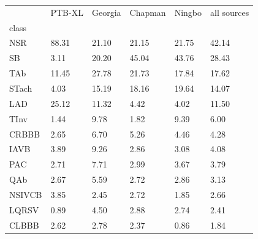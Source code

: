\begin{tabular}{llllll}
\toprule
 & PTB-XL & Georgia & Chapman & Ningbo & all sources \\
class &  &  &  &  &  \\
\midrule
NSR & 88.31 & 21.10 & 21.15 & 21.75 & 42.14 \\
SB & 3.11 & 20.20 & 45.04 & 43.76 & 28.43 \\
TAb & 11.45 & 27.78 & 21.73 & 17.84 & 17.62 \\
STach & 4.03 & 15.19 & 18.16 & 19.64 & 14.07 \\
LAD & 25.12 & 11.32 & 4.42 & 4.02 & 11.50 \\
TInv & 1.44 & 9.78 & 1.82 & 9.39 & 6.00 \\
CRBBB & 2.65 & 6.70 & 5.26 & 4.46 & 4.28 \\
IAVB & 3.89 & 9.26 & 2.86 & 3.08 & 4.08 \\
PAC & 2.71 & 7.71 & 2.99 & 3.67 & 3.79 \\
QAb & 2.67 & 5.59 & 2.72 & 2.86 & 3.13 \\
NSIVCB & 3.85 & 2.45 & 2.72 & 1.85 & 2.66 \\
LQRSV & 0.89 & 4.50 & 2.88 & 2.74 & 2.41 \\
CLBBB & 2.62 & 2.78 & 2.37 & 0.86 & 1.84 \\
\bottomrule
\end{tabular}
